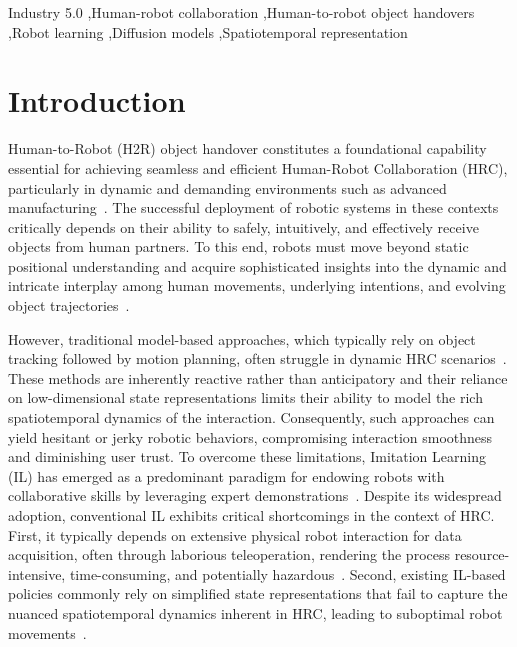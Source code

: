 \documentclass[final,5p,times,twocolumn]{elsarticle}
\begin{document}
\begin{frontmatter}
\begin{keyword}
Industry 5.0 \sep Human-robot collaboration \sep Human-to-robot object handovers \sep Robot learning \sep Diffusion models \sep Spatiotemporal representation
\end{keyword}

\end{frontmatter}

\section{Introduction} \label{sec:1}
Human-to-Robot (H2R) object handover constitutes a foundational capability essential for achieving seamless and efficient Human-Robot Collaboration (HRC), particularly in dynamic and demanding environments such as advanced manufacturing~\cite{ortenzi2021object, wang2022, zhong07032024, qin2026robot, yan2025human, zhong2025solving}. The successful deployment of robotic systems in these contexts critically depends on their ability to safely, intuitively, and effectively receive objects from human partners. To this end, robots must move beyond static positional understanding and acquire sophisticated insights into the dynamic and intricate interplay among human movements, underlying intentions, and evolving object trajectories~\cite{liu2025multimodal, li2024industrial, li2023proactive, wu2026empowering}. 

However, traditional model-based approaches, which typically rely on object tracking followed by motion planning, often struggle in dynamic HRC scenarios~\cite{hartley2003multiple, rosenberger2020object}. These methods are inherently reactive rather than anticipatory and their reliance on low-dimensional state representations limits their ability to model the rich spatiotemporal dynamics of the interaction. Consequently, such approaches can yield hesitant or jerky robotic behaviors, compromising interaction smoothness and diminishing user trust. To overcome these limitations, Imitation Learning (IL) has emerged as a predominant paradigm for endowing robots with collaborative skills by leveraging expert demonstrations~\cite{wang2018facilitating, Zare2024survey}. Despite its widespread adoption, conventional IL exhibits critical shortcomings in the context of HRC. First, it typically depends on extensive physical robot interaction for data acquisition, often through laborious teleoperation, rendering the process resource-intensive, time-consuming, and potentially hazardous~\cite{jaquier2025transfer, Belkhale2023}. Second, existing IL-based policies commonly rely on simplified state representations that fail to capture the nuanced spatiotemporal dynamics inherent in HRC, leading to suboptimal robot movements~\cite{zheng2022imitation, liu2022robot}.
\end{document}
